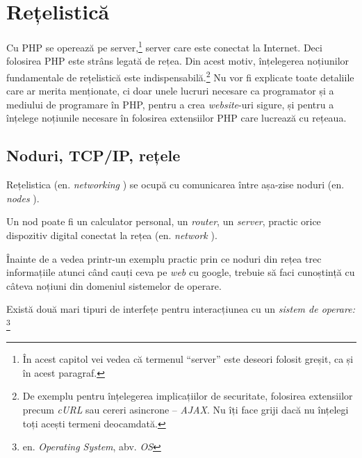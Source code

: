 \chapter{Rețelistică}

\begin{chapsummary}

Cu PHP se operează pe server,\footnote{În acest capitol vei vedea că termenul
``server'' este deseori folosit greșit, ca și în acest paragraf.} server care
este conectat la Internet. Deci folosirea PHP este strâns legată de rețea. Din
acest motiv, înțelegerea noțiunilor fundamentale de rețelistică este
indispensabilă.\footnote{De exemplu pentru înțelegerea implicațiilor de
securitate, folosirea extensiilor precum \textsl{cURL} sau cereri asincrone --
\textsl{AJAX}. Nu îți face griji dacă nu înțelegi toți acești termeni
deocamdată.} Nu vor fi explicate toate detaliile care ar merita menționate, ci
doar unele lucruri necesare ca programator și a mediului de programare în PHP,
pentru a crea \textsl{website}-uri sigure, și pentru a înțelege noțiunile
necesare în folosirea extensiilor PHP care lucrează cu rețeaua.

\end{chapsummary}

\section{Noduri, TCP/IP, rețele}

Rețelistica (en. \textsl{networking}
) se ocupă cu comunicarea între așa-zise
noduri (en. \textsl{nodes}
).

Un nod poate fi un calculator personal, un \textsl{router}, un \textsl{server},
practic orice dispozitiv digital conectat la rețea (en.
\textsl{network} ).

Înainte de a vedea printr-un exemplu practic prin ce noduri din rețea trec
informațiile atunci când cauți ceva pe \textsl{web} cu google, trebuie să faci
cunoștință cu câteva noțiuni din domeniul sistemelor de operare.

Există două mari tipuri de interfețe pentru interacțiunea cu un
\textsl{sistem de operare:}
\footnote{en. \textsl{Operating System}, abv. \textsl{OS}}

